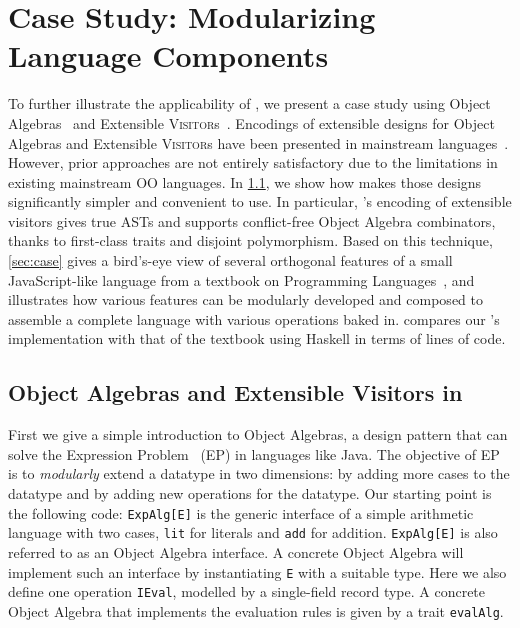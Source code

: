
\chapter{Case Study: Modularizing Language Components}
\label{chap:case_study}

To further illustrate the applicability of \sedel, we present a case
study using Object Algebras~\citep{oliveira2012extensibility} and
Extensible \textsc{Visitor}s~\citep{oliveira09modular, togersen:2004}. Encodings
of extensible designs for Object Algebras and Extensible \textsc{Visitor}s have
been presented in mainstream languages~\citep{oliveira09modular, togersen:2004, oliveira2012extensibility, oliveira2013feature, rendel14attributes}.
However, prior approaches are not entirely satisfactory
due to the limitations in existing mainstream OO languages. In \cref{sec:ob}, we show how \sedel makes those designs significantly simpler and
convenient to use. In particular, \sedel's encoding of extensible visitors gives true ASTs and supports
conflict-free Object Algebra combinators, thanks to first-class traits and disjoint polymorphism.
Based on this technique, \cref{sec:case} gives a bird's-eye view of several orthogonal features of
a small JavaScript-like language from a textbook on Programming
Languages~\citep{poplcook}, and illustrates how various features can
be modularly developed and composed to assemble a complete language with various
operations baked in.  compares our \sedel's implementation
with that of the textbook using Haskell in terms of lines of code.


\section{Object Algebras and Extensible Visitors in \sedel}
\label{sec:ob}

First we give a simple introduction to Object Algebras, a design pattern that
can solve the Expression Problem~\citep{wadler1998expression} (EP) in languages like
Java. The objective of EP is to \emph{modularly} extend a datatype in two
dimensions: by adding more cases to the datatype and by adding new operations
for the datatype.
Our starting point is the following code:
\lstinline{ExpAlg[E]} is the generic interface of a simple arithmetic language
with two cases, \lstinline{lit} for literals and \lstinline{add} for addition.
\lstinline{ExpAlg[E]} is also referred to as an Object Algebra interface. A concrete
Object Algebra will implement such an interface by instantiating \lstinline{E}
with a suitable type. Here we also define one operation \lstinline{IEval},
modelled by a single-field record type. A concrete Object Algebra that
implements the evaluation rules is given by a trait
\lstinline{evalAlg}.

